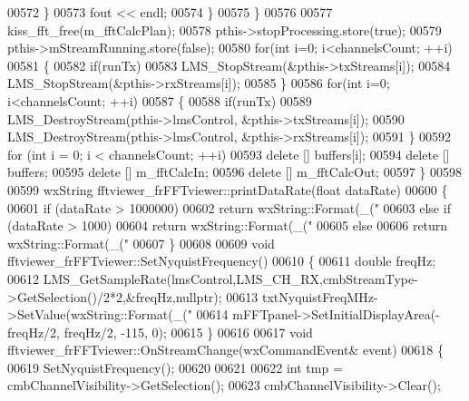 \begin{DoxyCode}
{{{00572             \}
00573             fout << endl;
00574         \}
00575     \}
00576 
00577     kiss_fft_free(m\_fftCalcPlan);
00578     pthis->stopProcessing.store(\textcolor{keyword}{true});
00579     pthis->mStreamRunning.store(\textcolor{keyword}{false});
00580     \textcolor{keywordflow}{for}(\textcolor{keywordtype}{int} i=0; i<channelsCount; ++i)
00581     \{
00582         \textcolor{keywordflow}{if}(runTx)
00583             LMS_StopStream(&pthis->txStreams[i]);
00584         LMS_StopStream(&pthis->rxStreams[i]);
00585     \}
00586     \textcolor{keywordflow}{for}(\textcolor{keywordtype}{int} i=0; i<channelsCount; ++i)
00587     \{
00588         \textcolor{keywordflow}{if}(runTx)
00589             LMS_DestroyStream(pthis->lmsControl, &pthis->txStreams[i]);
00590         LMS_DestroyStream(pthis->lmsControl, &pthis->rxStreams[i]);
00591     \}
00592     \textcolor{keywordflow}{for} (\textcolor{keywordtype}{int} i = 0; i < channelsCount; ++i)
00593         \textcolor{keyword}{delete} [] buffers[i];
00594     \textcolor{keyword}{delete} [] buffers;
00595     \textcolor{keyword}{delete} [] m\_fftCalcIn;
00596     \textcolor{keyword}{delete} [] m\_fftCalcOut;
00597 \}
00598 
00599 wxString fftviewer_frFFTviewer::printDataRate(\textcolor{keywordtype}{float} dataRate)
00600 \{
00601     \textcolor{keywordflow}{if} (dataRate > 1000000)
00602         \textcolor{keywordflow}{return} wxString::Format(\_(\textcolor{stringliteral}{"%
00603     \textcolor{keywordflow}{else} \textcolor{keywordflow}{if} (dataRate > 1000)
00604         \textcolor{keywordflow}{return} wxString::Format(\_(\textcolor{stringliteral}{"%
00605     \textcolor{keywordflow}{else}
00606         \textcolor{keywordflow}{return} wxString::Format(\_(\textcolor{stringliteral}{"%
00607 \}
00608 
00609 \textcolor{keywordtype}{void} fftviewer_frFFTviewer::SetNyquistFrequency()
00610 \{
00611     \textcolor{keywordtype}{double} freqHz;
00612     LMS_GetSampleRate(lmsControl,LMS_CH_RX,cmbStreamType->GetSelection()/2*2,&freqHz,\textcolor{keyword}{nullptr});
00613     txtNyquistFreqMHz->SetValue(wxString::Format(\_(\textcolor{stringliteral}{"%
00614     mFFTpanel->SetInitialDisplayArea(-freqHz/2, freqHz/2, -115, 0);
00615 \}
00616 
00617 \textcolor{keywordtype}{void} fftviewer_frFFTviewer::OnStreamChange(wxCommandEvent& event)
00618 \{
00619     SetNyquistFrequency();
00620 
00621 
00622     \textcolor{keywordtype}{int} tmp = cmbChannelVisibility->GetSelection();
00623     cmbChannelVisibility->Clear();
}}}}}}}
\end{DoxyCode}
